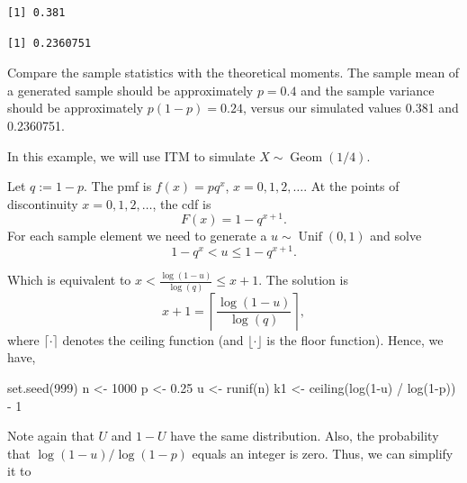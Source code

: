 \documentclass[
  letterpaper,
  DIV=11,
  numbers=noendperiod]{scrreprt}
\newenvironment{Shaded}{\begin{snugshade}}{\end{snugshade}}
\newcommand{\DecValTok}[1]{\textcolor[rgb]{0.68,0.00,0.00}{#1}}
\newcommand{\FloatTok}[1]{\textcolor[rgb]{0.68,0.00,0.00}{#1}}
\newcommand{\FunctionTok}[1]{\textcolor[rgb]{0.28,0.35,0.67}{#1}}
\newcommand{\NormalTok}[1]{\textcolor[rgb]{0.00,0.23,0.31}{#1}}
\newcommand{\OtherTok}[1]{\textcolor[rgb]{0.00,0.23,0.31}{#1}}
\newcommand{\SpecialCharTok}[1]{\textcolor[rgb]{0.37,0.37,0.37}{#1}}
\begin{document}
\begin{verbatim}
[1] 0.381
\end{verbatim}

\begin{verbatim}
[1] 0.2360751
\end{verbatim}

Compare the sample statistics with the theoretical moments. The sample
mean of a generated sample should be approximately \(p = 0.4\) and the
sample variance should be approximately \(p(1 - p) = 0.24\), versus our
simulated values 0.381 and 0.2360751.

In this example, we will use ITM to simulate
\(X\sim \operatorname{Geom}(1/4)\).

Let \(q:=1-p\). The pmf is \(f(x) = p q^x\), \(x = 0,1,2,\ldots\). At
the points of discontinuity \(x = 0,1,2,\ldots\), the cdf is \[
F(x) = 1 - q^{x+1}.
\] For each sample element we need to generate a
\(u\sim \operatorname{Unif}(0,1)\) and solve \[
1 - q^x < u \leq 1 - q^{x+1}.
\]

Which is equivalent to \(x < \frac{\log(1 - u)}{\log(q)} \leq x+1.\) The
solution is \[
x + 1 = \left\lceil \frac{\log(1 - u)}{\log(q)} \right\rceil,
\] where \(\lceil \cdot \rceil\) denotes the ceiling function (and
\(\lfloor \cdot \rfloor\) is the floor function). Hence, we have,

\begin{Shaded}
\begin{Highlighting}[]
\FunctionTok{set.seed}\NormalTok{(}\DecValTok{999}\NormalTok{)}
\NormalTok{n }\OtherTok{\textless{}{-}} \DecValTok{1000}
\NormalTok{p }\OtherTok{\textless{}{-}} \FloatTok{0.25}
\NormalTok{u }\OtherTok{\textless{}{-}} \FunctionTok{runif}\NormalTok{(n)}
\NormalTok{k1 }\OtherTok{\textless{}{-}} \FunctionTok{ceiling}\NormalTok{(}\FunctionTok{log}\NormalTok{(}\DecValTok{1}\SpecialCharTok{{-}}\NormalTok{u) }\SpecialCharTok{/} \FunctionTok{log}\NormalTok{(}\DecValTok{1}\SpecialCharTok{{-}}\NormalTok{p)) }\SpecialCharTok{{-}} \DecValTok{1}
\end{Highlighting}
\end{Shaded}

Note again that \(U\) and \(1 - U\) have the same distribution. Also,
the probability that \(\log(1 - u)/\log(1 - p)\) equals an integer is
zero. Thus, we can simplify it to
\end{document}
